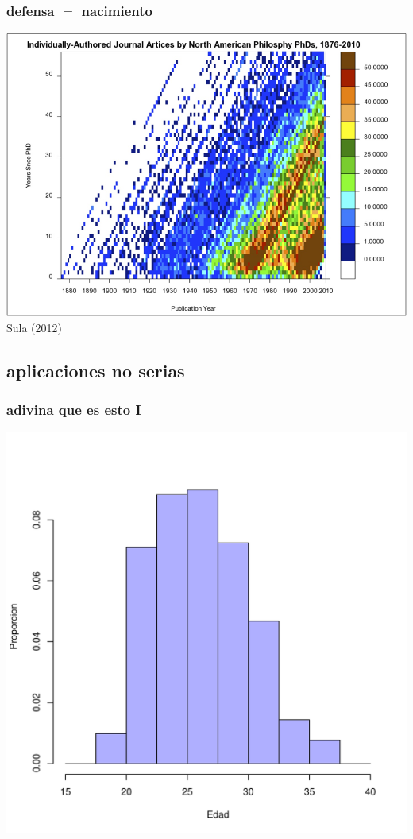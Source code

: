 \documentclass[20pt]{beamer}
\begin{document}
\begin{frame}
\frametitle{defensa $=$ nacimiento}
\includegraphics[scale=1.3]{Figures/LexisArticles.png}\\
Sula (2012)
\end{frame}

\subsection{aplicaciones no serias}
\begin{frame}
\frametitle{adivina que es esto I}
\includegraphics[scale=.8]{Figures/PlayersAges.pdf}
\end{frame}
\end{document}
